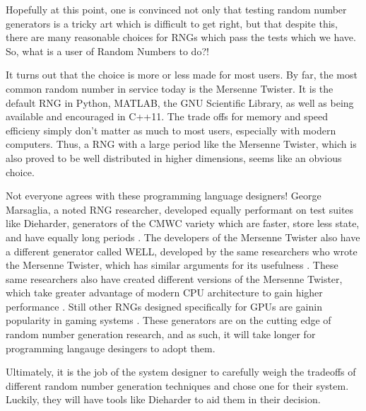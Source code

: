 Hopefully at this point, one is convinced not only that testing random number generators is a tricky art which is difficult to get right, but that despite this, there are many reasonable choices for RNGs which pass the tests which we have. So, what is a user of Random Numbers to do?!

It turns out that the choice is more or less made for most users. By far, the most common random number in service today is the Mersenne Twister. It is the default RNG in Python, MATLAB, the GNU Scientific Library, as well as being available and encouraged in C++11. The trade offs for memory and speed efficieny simply don't matter as much to most users, especially with modern computers. Thus, a RNG with a large period like the Mersenne Twister, which is also proved to be well distributed in higher dimensions, seems like an obvious choice.

Not everyone agrees with these programming language designers! George Marsaglia, a noted RNG researcher, developed equally performant on test suites like Dieharder, generators of the CMWC variety which are faster, store less state, and have equally long periods \cite{Marsaglia:2003:SRN:769800.769827}. The developers of the Mersenne Twister also have a different generator called WELL, developed by the same researchers who wrote the Mersenne Twister, which has similar arguments for its usefulness \cite{Panneton:2006:ILG:1132973.1132974}. These same researchers also have created different versions of the Mersenne Twister, which take greater advantage of modern CPU architecture to gain higher performance \cite{sfmt,tinymt}. Still other RNGs designed specifically for GPUs are gainin popularity in gaming systems \cite{Passerat-Palmbach:2011:PNG:2060104.2060643,Zafar:2010:GRN:1921479.1921500}. These generators are on the cutting edge of random number generation research, and as such, it will take longer for programming langauge desingers to adopt them.

Ultimately, it is the job of the system designer to carefully weigh the tradeoffs of different random number generation techniques and chose one for their system. Luckily, they will have tools like Dieharder to aid them in their decision.
